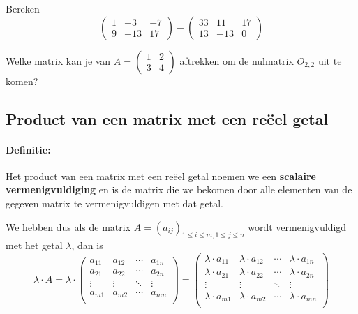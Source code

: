\documentclass[12pt,twoside]{article}
\begin{document}
\begin{oefening}
  Bereken
  \[
  \begin{pmatrix}
    1 & -3 & -7\\
    9 & -13 & 17
  \end{pmatrix}
  -
  \begin{pmatrix}
    33 & 11 & 17\\
    13 & -13 & 0
  \end{pmatrix}
  \]
\end{oefening}

\begin{oefening}
  Welke matrix kan je van
  $A=
  \begin{pmatrix}
    1 & 2\\ 3 & 4
  \end{pmatrix}
  $
  aftrekken om de nulmatrix $O_{2,2}$ uit te komen?
\end{oefening}

\subsection{Product van een matrix met een reëel getal}

\paragraph*{Definitie:} Het product van een matrix met een reëel getal noemen we een {\bf scalaire vermenigvuldiging} en is de matrix die we bekomen door alle elementen van de gegeven matrix te vermenigvuldigen met dat getal.

We hebben dus als de matrix $A=(a_{ij})_{1 \leq i \leq m , 1 \leq j \leq n}$ wordt vermenigvuldigd met het getal $\lambda$, dan is
$$\lambda \cdot A = \lambda \cdot
\begin{pmatrix}
  a_{11}               & a_{12}               & \cdots & a_{1n}               \\
  a_{21}               & a_{22}               & \cdots & a_{2n}               \\
  \vdots               & \vdots               & \ddots & \vdots               \\
  a_{m1}               & a_{m2}               & \cdots & a_{mn}               \\
\end{pmatrix}
=
\begin{pmatrix}
  \lambda \cdot a_{11} & \lambda \cdot a_{12} & \cdots & \lambda \cdot a_{1n} \\
  \lambda \cdot a_{21} & \lambda \cdot a_{22} & \cdots & \lambda \cdot a_{2n} \\
  \vdots               & \vdots               & \ddots & \vdots               \\
  \lambda \cdot a_{m1} & \lambda \cdot a_{m2} & \cdots & \lambda \cdot a_{mn} \\
\end{pmatrix}
$$
\end{document}
